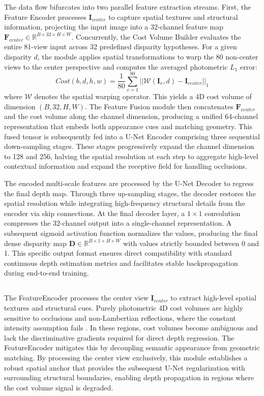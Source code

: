 \documentclass[lettersize,journal]{IEEEtran}
\begin{document}
The data flow bifurcates into two parallel feature extraction streams. First, the Feature Encoder processes $\mathbf{I}_{center}$ to capture spatial textures and structural information, projecting the input image into a 32-channel feature map $\mathbf{F}_{center} \in \mathbb{R}^{B \times 32 \times H \times W}$. Concurrently, the Cost Volume Builder evaluates the entire 81-view input across 32 predefined disparity hypotheses. For a given disparity $d$, the module applies spatial transformations to warp the 80 non-center views to the center perspective and computes the averaged photometric $L_1$ error:
\begin{equation}
Cost(b, d, h, w) = \frac{1}{80} \sum_{v=1}^{80} || \mathcal{W}(\mathbf{I}_v, d) - \mathbf{I}_{center} ||_1
\end{equation}
where $\mathcal{W}$ denotes the spatial warping operator. This yields a 4D cost volume of dimension $(B, 32, H, W)$. The Feature Fusion module then concatenates $\mathbf{F}_{center}$ and the cost volume along the channel dimension, producing a unified 64-channel representation that embeds both appearance cues and matching geometry. This fused tensor is subsequently fed into a U-Net Encoder comprising three sequential down-sampling stages. These stages progressively expand the channel dimension to 128 and 256, halving the spatial resolution at each step to aggregate high-level contextual information and expand the receptive field for handling occlusions.

The encoded multi-scale features are processed by the U-Net Decoder to regress the final depth map. Through three up-sampling stages, the decoder restores the spatial resolution while integrating high-frequency structural details from the encoder via skip connections. At the final decoder layer, a $1 \times 1$ convolution compresses the 32-channel output into a single-channel representation. A subsequent sigmoid activation function normalizes the values, producing the final dense disparity map $\mathbf{D} \in \mathbb{R}^{B \times 1 \times H \times W}$ with values strictly bounded between 0 and 1. This specific output format ensures direct compatibility with standard continuous depth estimation metrics and facilitates stable backpropagation during end-to-end training.

\subsection{}

The FeatureEncoder processes the center view $\mathbf{I}_{center}$ to extract high-level spatial textures and structural cues. Purely photometric 4D cost volumes are highly sensitive to occlusions and non-Lambertian reflections, where the constant intensity assumption fails \cite{li2021}. In these regions, cost volumes become ambiguous and lack the discriminative gradients required for direct depth regression. The FeatureEncoder mitigates this by decoupling semantic appearance from geometric matching. By processing the center view exclusively, this module establishes a robust spatial anchor that provides the subsequent U-Net regularization with surrounding structural boundaries, enabling depth propagation in regions where the cost volume signal is degraded.
\end{document}
